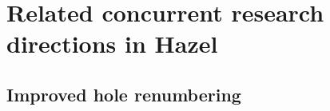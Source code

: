 \section{Related concurrent research directions in Hazel}
\label{app:contributions}

\subsection{Improved hole renumbering}
\label{sec:other_hole_numbering}


